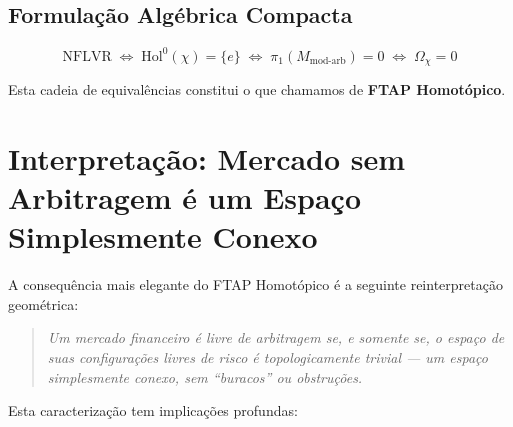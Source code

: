 \subsection{Formula\c{c}\~ao Alg\'ebrica Compacta}

\begin{equation}\label{eq:FTAP-compact}
\boxed{\text{NFLVR} \;\Longleftrightarrow\; \text{Hol}^0(\chi) = \{e\} \;\Longleftrightarrow\; \pi_1(M_{\text{mod-arb}}) = 0 \;\Longleftrightarrow\; \Omega_\chi = 0}
\end{equation}

Esta cadeia de equival\^encias constitui o que chamamos de \textbf{FTAP Homot\'opico}.

\section{Interpreta\c{c}\~ao: Mercado sem Arbitragem \'e um Espa\c{c}o Simplesmente Conexo}

A consequ\^encia mais elegante do FTAP Homot\'opico \'e a seguinte reinterpreta\c{c}\~ao geom\'etrica:

\begin{quote}
\textit{Um mercado financeiro \'e livre de arbitragem se, e somente se, o espa\c{c}o de suas configura\c{c}\~oes livres de risco \'e topologicamente trivial --- um espa\c{c}o simplesmente conexo, sem ``buracos'' ou obstru\c{c}\~oes.}
\end{quote}

Esta caracteriza\c{c}\~ao tem implica\c{c}\~oes profundas:

